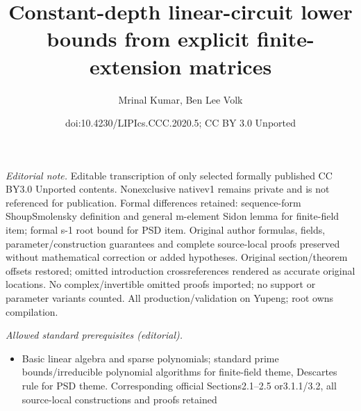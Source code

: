 \documentclass[10pt,a4paper]{article}
\title{Constant-depth linear-circuit lower bounds from explicit finite-extension matrices}
\author{Mrinal Kumar, Ben Lee Volk}
\date{doi:10.4230/LIPIcs.CCC.2020.5; CC BY 3.0 Unported}
\begin{document}
\maketitle
\noindent\textit{Editorial note.} Editable transcription of only selected formally published CC BY3.0 Unported contents. Nonexclusive nativev1 remains private and is not referenced for publication. Formal differences retained: sequence-form ShoupSmolensky definition and general m-element Sidon lemma for finite-field item; formal s-1 root bound for PSD item. Original author formulas, fields, parameter/construction guarantees and complete source-local proofs preserved without mathematical correction or added hypotheses. Original section/theorem offsets restored; omitted introduction crossreferences rendered as accurate original locations. No complex/invertible omitted proofs imported; no support or parameter variants counted. All production/validation on Yupeng; root owns compilation.\par\medskip
\noindent\textit{Allowed standard prerequisites (editorial).}\begin{itemize}
\item Basic linear algebra and sparse polynomials; standard prime bounds/irreducible polynomial algorithms for finite-field theme, Descartes rule for PSD theme. Corresponding official Sections2.1–2.5 or3.1.1/3.2, all source-local constructions and proofs retained
\end{itemize}\medskip
\end{document}
